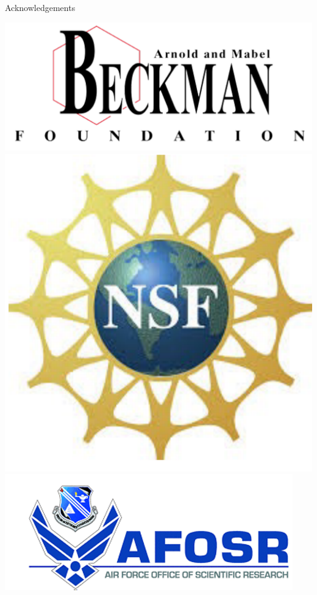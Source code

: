 \documentclass[final]{beamer}
\newlength{\colonewid}
\begin{document}
\begin{frame}[t]
\begin{columns}[t]
\begin{column}{\colonewid}
      \begin{block}{Acknowledgements}
        \begin{center}
          \includegraphics[height=0.18\colonewid]{beckman}
          \hspace{15ex}\includegraphics[height=0.18\colonewid]{nsf}\\
          \includegraphics[height=0.18\colonewid]{afosr}

\end{center}
\end{block}
\end{column}
\end{columns}
\end{frame}
\end{document}
